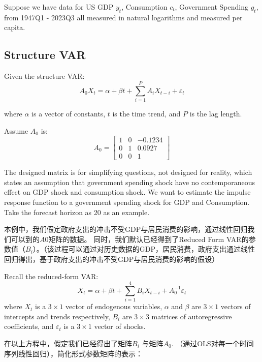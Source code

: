 \documentclass{article}
\begin{document}
\begin{CJK}{UTF8}{gbsn}
Suppose we have data for US GDP $y_t$, Consumption $c_t$, Government Spending $g_t$, from 1947Q1 - 2023Q3 all measured in natural logarithms and measured per capita.

\subsection*{Structure VAR}
Given the structure VAR:
\begin{equation}
    A_0X_t = \alpha + \beta t + \sum_{i=1}^{P} A_iX_{t-i} + \varepsilon_t
\end{equation}

where $\alpha$ is a vector of constants, $t$ is the time trend, and $P$ is the lag length.

Assume $A_0$ is:
\begin{equation}
    A_0 = \begin{bmatrix}
    1 & 0 & -0.1234  \\
    0 & 1 &  0.0927\\
    0 & 0 & 1 
    \end{bmatrix}
\end{equation}

The designed matrix is for simplifying questions, not designed for reality, which states an assumption that government spending shock have no contemporaneous effect on GDP shock and consumption shock. We want to estimate the impulse response function to a government spending shock for GDP and Consumption. Take the forecast horizon as 20 as an example.

本例中，我们假定政府支出的冲击不受GDP与居民消费的影响，通过线性回归我们可以到的$A0$矩阵的数据。
同时，我们默认已经得到了Reduced Form VAR的参数值（$B_i$）。（该过程可以通过对历史数据的GDP，居民消费，政府支出通过线性回归得出，基于政府支出的冲击不受GDP与居民消费的影响的假设）

Recall the reduced-form VAR:
\begin{equation}
    X_t = \alpha + \beta t + \sum_{i=1}^{4} B_i X_{t-i} + A_0^{-1} \varepsilon_t
\end{equation}
where $X_t$ is a $3 \times 1$ vector of endogenous variables, $\alpha$ and $\beta$ are $3 \times 1$ vectors of intercepts and trends respectively, $B_i$ are $3 \times 3$ matrices of autoregressive coefficients, and $\varepsilon_t$ is a $3 \times 1$ vector of shocks.

在以上方程中，假定我们已经得出了矩阵$B_i$ 与矩阵$A_0$. （通过OLS对每一个时间序列线性回归），简化形式参数矩阵的表示：


\end{CJK}
\end{document}
